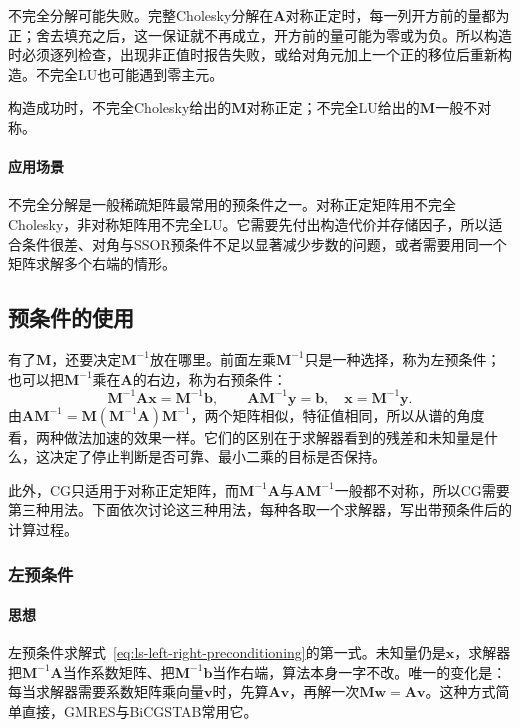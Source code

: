不完全分解可能失败。完整Cholesky分解在$\bm A$对称正定时，每一列开方前的量都为正；舍去填充之后，这一保证就不再成立，开方前的量可能为零或为负。所以构造时必须逐列检查，出现非正值时报告失败，或给对角元加上一个正的移位后重新构造。不完全LU也可能遇到零主元。

构造成功时，不完全Cholesky给出的$\bm M$对称正定；不完全LU给出的$\bm M$一般不对称。

\paragraph{应用场景}
不完全分解是一般稀疏矩阵最常用的预条件之一。对称正定矩阵用不完全Cholesky，非对称矩阵用不完全LU。它需要先付出构造代价并存储因子，所以适合条件很差、对角与SSOR预条件不足以显著减少步数的问题，或者需要用同一个矩阵求解多个右端的情形。

\subsection{预条件的使用}
\label{sec:ls-preconditioner-usage}

有了$\bm M$，还要决定$\bm M^{-1}$放在哪里。前面左乘$\bm M^{-1}$只是一种选择，称为左预条件；也可以把$\bm M^{-1}$乘在$\bm A$的右边，称为右预条件：
\begin{equation}
 \bm M^{-1}\bm A\bm x=\bm M^{-1}\bm b,\qquad
 \bm A\bm M^{-1}\bm y=\bm b,\quad \bm x=\bm M^{-1}\bm y .
 \label{eq:ls-left-right-preconditioning}
\end{equation}
由$\bm A\bm M^{-1}=\bm M(\bm M^{-1}\bm A)\bm M^{-1}$，两个矩阵相似，特征值相同，所以从谱的角度看，两种做法加速的效果一样。它们的区别在于求解器看到的残差和未知量是什么，这决定了停止判断是否可靠、最小二乘的目标是否保持。

此外，CG只适用于对称正定矩阵，而$\bm M^{-1}\bm A$与$\bm A\bm M^{-1}$一般都不对称，所以CG需要第三种用法。下面依次讨论这三种用法，每种各取一个求解器，写出带预条件后的计算过程。

\subsubsection{左预条件}

\paragraph{思想}
左预条件求解式~\eqref{eq:ls-left-right-preconditioning}的第一式。未知量仍是$\bm x$，求解器把$\bm M^{-1}\bm A$当作系数矩阵、把$\bm M^{-1}\bm b$当作右端，算法本身一字不改。唯一的变化是：每当求解器需要系数矩阵乘向量$\bm v$时，先算$\bm A\bm v$，再解一次$\bm M\bm w=\bm A\bm v$。这种方式简单直接，GMRES与BiCGSTAB常用它。

